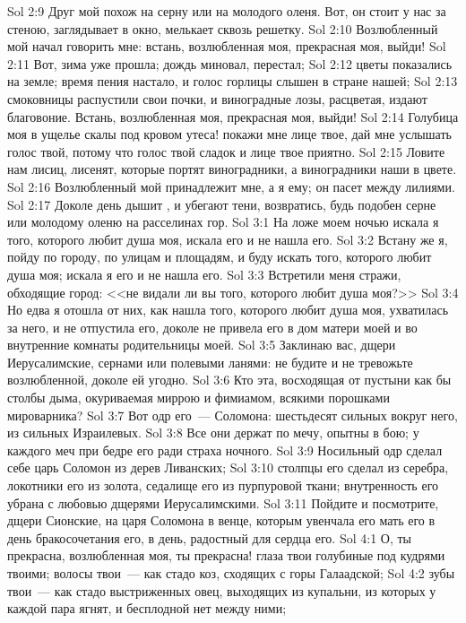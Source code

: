 \vs Sol 2:9 Друг мой похож на серну или на молодого оленя. Вот, он стоит у нас за стеною, заглядывает в окно, мелькает сквозь решетку.
\vs Sol 2:10 Возлюбленный мой начал говорить мне: встань, возлюбленная моя, прекрасная моя, выйди!
\vs Sol 2:11 Вот, зима уже прошла; дождь миновал, перестал;
\vs Sol 2:12 цветы показались на земле; время пения настало, и голос горлицы слышен в стране нашей;
\vs Sol 2:13 смоковницы распустили свои почки, и виноградные лозы, расцветая, издают благовоние. Встань, возлюбленная моя, прекрасная моя, выйди!
\vs Sol 2:14 Голубица моя в ущелье скалы под кровом утеса! покажи мне лице твое, дай мне услышать голос твой, потому что голос твой сладок и лице твое приятно.
\vs Sol 2:15 Ловите нам лисиц, лисенят, которые портят виноградники, а виноградники наши в цвете.
\rsbpar\vs Sol 2:16 Возлюбленный мой принадлежит мне, а я ему; он пасет между лилиями.
\vs Sol 2:17 Доколе день дышит , и убегают тени, возвратись, будь подобен серне или молодому оленю на расселинах гор.
\vs Sol 3:1 На ложе моем ночью искала я того, которого любит душа моя, искала его и не нашла его.
\vs Sol 3:2 Встану же я, пойду по городу, по улицам и площадям, и буду искать того, которого любит душа моя; искала я его и не нашла его.
\vs Sol 3:3 Встретили меня стражи, обходящие город: <<не видали ли вы того, которого любит душа моя?>>
\vs Sol 3:4 Но едва я отошла от них, как нашла того, которого любит душа моя, ухватилась за него, и не отпустила его, доколе не привела его в дом матери моей и во внутренние комнаты родительницы моей.
\rsbpar\vs Sol 3:5 Заклинаю вас, дщери Иерусалимские, сернами или полевыми ланями: не будите и не тревожьте возлюбленной, доколе ей угодно.
\vs Sol 3:6 Кто эта, восходящая от пустыни как бы столбы дыма, окуриваемая миррою и фимиамом, всякими порошками мироварника?
\rsbpar\vs Sol 3:7 Вот одр его~--- Соломона: шестьдесят сильных вокруг него, из сильных Израилевых.
\vs Sol 3:8 Все они держат по мечу, опытны в бою; у каждого меч при бедре его ради страха ночного.
\vs Sol 3:9 Носильный одр сделал себе царь Соломон из дерев Ливанских;
\vs Sol 3:10 столпцы его сделал из серебра, локотники его из золота, седалище его из пурпуровой ткани; внутренность его убрана с любовью дщерями Иерусалимскими.
\vs Sol 3:11 Пойдите и посмотрите, дщери Сионские, на царя Соломона в венце, которым увенчала его мать его в день бракосочетания его, в день, радостный для сердца его.
\vs Sol 4:1 О, ты прекрасна, возлюбленная моя, ты прекрасна! глаза твои голубиные под кудрями твоими; волосы твои~--- как стадо коз, сходящих с горы Галаадской;
\vs Sol 4:2 зубы твои~--- как стадо выстриженных овец, выходящих из купальни, из которых у каждой пара ягнят, и бесплодной нет между ними;
